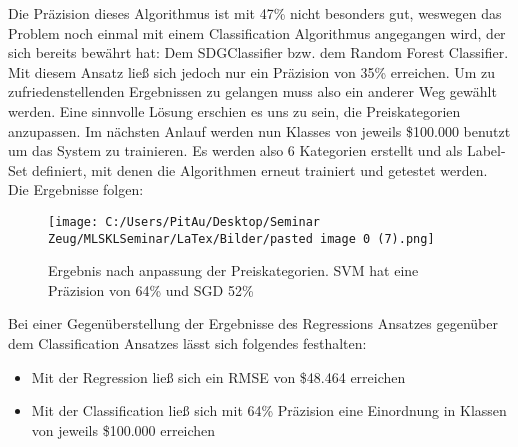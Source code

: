 Die Präzision dieses Algorithmus ist mit 47\% nicht besonders gut, weswegen das Problem noch einmal mit einem Classification Algorithmus angegangen wird, der sich bereits bewährt hat: Dem SDGClassifier bzw. dem Random Forest Classifier. Mit diesem Ansatz ließ sich jedoch nur ein Präzision von 35\% erreichen. Um zu zufriedenstellenden Ergebnissen zu gelangen muss also ein anderer Weg gewählt werden. 
\newline
Eine sinnvolle Lösung erschien es uns zu sein, die Preiskategorien anzupassen. Im nächsten Anlauf werden nun Klasses von jeweils \$100.000 benutzt um das System zu trainieren. Es werden also 6 Kategorien erstellt und als Label-Set definiert, mit denen die Algorithmen erneut trainiert und getestet werden. Die Ergebnisse folgen:
\newline
\begin{figure}
	\texttt{[image: C:/Users/PitAu/Desktop/Seminar Zeug/MLSKLSeminar/LaTex/Bilder/pasted image 0 (7).png]}
	\caption{Ergebnis nach anpassung der Preiskategorien. SVM hat eine Präzision von 64\% und SGD 52\%}
\end{figure}

Bei einer Gegenüberstellung der Ergebnisse des Regressions Ansatzes gegenüber dem Classification Ansatzes lässt sich folgendes festhalten:
\begin{itemize}
\item Mit der Regression ließ sich ein RMSE von \$48.464 erreichen
\item Mit der Classification ließ sich mit 64\% Präzision eine Einordnung in Klassen von jeweils \$100.000 erreichen
\end{itemize}

